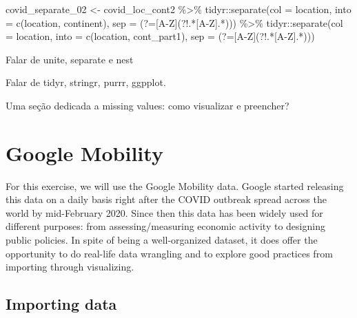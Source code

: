 \documentclass[
]{book}
\newenvironment{Shaded}{\begin{snugshade}}{\end{snugshade}}
\newcommand{\AttributeTok}[1]{\textcolor[rgb]{0.77,0.63,0.00}{#1}}
\newcommand{\FunctionTok}[1]{\textcolor[rgb]{0.00,0.00,0.00}{#1}}
\newcommand{\NormalTok}[1]{#1}
\newcommand{\OtherTok}[1]{\textcolor[rgb]{0.56,0.35,0.01}{#1}}
\newcommand{\SpecialCharTok}[1]{\textcolor[rgb]{0.00,0.00,0.00}{#1}}
\newcommand{\StringTok}[1]{\textcolor[rgb]{0.31,0.60,0.02}{#1}}
\begin{document}
\begin{Shaded}
\begin{Highlighting}[]
\NormalTok{covid\_separate\_02 }\OtherTok{\textless{}{-}}\NormalTok{ covid\_loc\_cont2 }\SpecialCharTok{\%\textgreater{}\%} 
\NormalTok{  tidyr}\SpecialCharTok{::}\FunctionTok{separate}\NormalTok{(}\AttributeTok{col  =} \StringTok{\textquotesingle{}location\textquotesingle{}}\NormalTok{,}
                  \AttributeTok{into =} \FunctionTok{c}\NormalTok{(}\StringTok{\textquotesingle{}location\textquotesingle{}}\NormalTok{, }\StringTok{\textquotesingle{}continent\textquotesingle{}}\NormalTok{),}
                  \AttributeTok{sep  =} \StringTok{\textquotesingle{}(?=[A{-}Z](?!.*[A{-}Z].*))\textquotesingle{}}\NormalTok{) }\SpecialCharTok{\%\textgreater{}\%}
\NormalTok{    tidyr}\SpecialCharTok{::}\FunctionTok{separate}\NormalTok{(}\AttributeTok{col  =} \StringTok{\textquotesingle{}location\textquotesingle{}}\NormalTok{,}
                  \AttributeTok{into =} \FunctionTok{c}\NormalTok{(}\StringTok{\textquotesingle{}location\textquotesingle{}}\NormalTok{, }\StringTok{\textquotesingle{}cont\_part1\textquotesingle{}}\NormalTok{),}
                  \AttributeTok{sep  =} \StringTok{\textquotesingle{}(?=[A{-}Z](?!.*[A{-}Z].*))\textquotesingle{}}\NormalTok{) }
\end{Highlighting}
\end{Shaded}

Falar de unite, separate e nest

Falar de tidyr, stringr, purrr, ggpplot.

Uma seção dedicada a missing values: como visualizar e preencher?

\hypertarget{google}{%
\chapter{Google Mobility}\label{google}}

For this exercise, we will use the Google Mobility data. Google started releasing this data on a daily basis right after the COVID outbreak spread across the world by mid-February 2020. Since then this data has been widely used for different purposes: from assessing/measuring economic activity to designing public policies. In spite of being a well-organized dataset, it does offer the opportunity to do real-life data wrangling and to explore good practices from importing through visualizing.

\hypertarget{importing-data}{%
\section{Importing data}\label{importing-data}}
\end{document}
